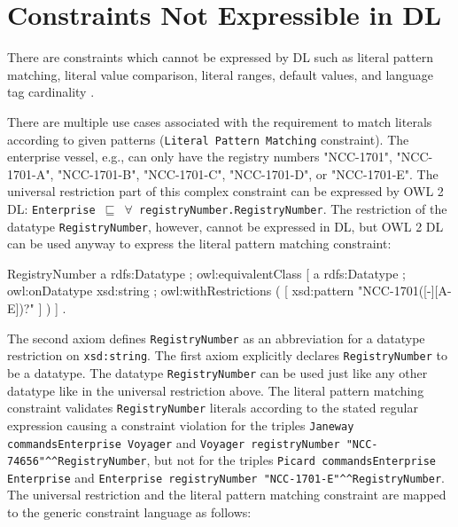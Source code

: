 \documentclass{llncs}
\newcommand{\ms}[1]{\texttt{#1}}
\begin{document}
\section{Constraints Not Expressible in DL}

There are constraints which cannot be expressed by DL such as literal pattern matching, literal value comparison, literal ranges, default values, and language tag cardinality \cite{BoschNolleAcarEckert2015}.


There are multiple use cases associated with the requirement to match literals according to given patterns (\ms{Literal Pattern Matching} constraint).
The enterprise vessel, e.g.,  can only have the registry numbers "NCC-1701", "NCC-1701-A", "NCC-1701-B", "NCC-1701-C", "NCC-1701-D", or "NCC-1701-E".
The universal restriction part of this complex constraint can be expressed by OWL 2 DL:
\ms{Enterprise $\sqsubseteq$ $\forall$ registryNumber.RegistryNumber}.
The restriction of the datatype \ms{RegistryNumber}, however, cannot be expressed in DL, but OWL 2 DL can be used anyway to express the literal pattern matching constraint:

\begin{ex}
RegistryNumber
    a rdfs:Datatype ;
    owl:equivalentClass [
        a rdfs:Datatype ;
        owl:onDatatype xsd:string ;
        owl:withRestrictions ( 
            [ xsd:pattern "NCC-1701([-][A-E])?" ] ) ] .
\end{ex}

The second axiom defines \ms{RegistryNumber} as an abbreviation for a datatype restriction on \ms{xsd:string}. 
The first axiom explicitly declares \ms{RegistryNumber} to be a datatype. 
The datatype \ms{RegistryNumber} can be used just like any other datatype like in the universal restriction above.
The literal pattern matching constraint validates \ms{RegistryNumber} literals according to the stated regular expression causing a constraint violation for the triples 
\ms{Janeway commandsEnterprise Voyager} and \ms{Voyager registryNumber "NCC-74656"\textasciicircum{}\textasciicircum{}RegistryNumber}, 
but not for the triples \ms{Picard commandsEnterprise Enterprise} and \ms{Enterprise registryNumber "NCC-1701-E"\textasciicircum{}\textasciicircum{}RegistryNumber}.
The universal restriction and the literal pattern matching constraint are mapped to the generic constraint language as follows:
\end{document}
